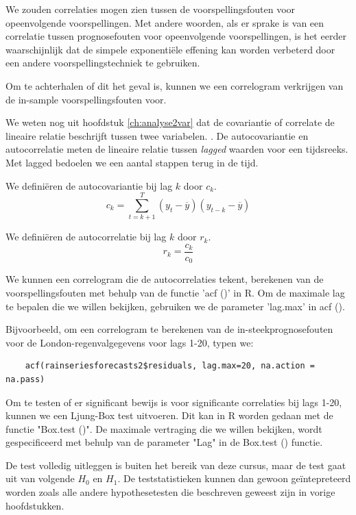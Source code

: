 We zouden correlaties mogen zien tussen de voorspellingsfouten voor opeenvolgende voorspellingen. Met andere woorden, als er sprake is van een correlatie tussen prognosefouten voor opeenvolgende voorspellingen, is het eerder waarschijnlijk dat de simpele exponentiële effening kan worden verbeterd door een andere voorspellingstechniek te gebruiken.

Om te achterhalen of dit het geval is, kunnen we een correlogram verkrijgen van de in-sample voorspellingsfouten voor.

We weten nog uit hoofdstuk \ref{ch:analyse2var} dat de covariantie of correlate de lineaire relatie beschrijft tussen twee variabelen. . De autocovariantie en autocorrelatie meten de lineaire relatie tussen \textit{lagged} waarden voor een tijdsreeks. Met lagged bedoelen we een aantal stappen terug in de tijd.

\begin{definition}[Autocovariantie]
	We defini\"eren de autocovariantie bij lag $k$ door $c_k$.
	\[ c_k = \sum_{t=k+1}^{T} (y_t - \overline{y})(y_{t-k} - \overline{y}) \]
\end{definition}

\begin{definition}[Autocorrelatie]
	We defini\"eren de autocorrelatie bij lag $k$ door $r_k$.
	\[ r_k = \frac{c_k}{c_0} \]
\end{definition}

 We kunnen een correlogram die de autocorrelaties tekent, berekenen van de voorspellingsfouten met behulp van de functie 'acf ()' in R. Om de maximale lag te bepalen die we willen bekijken, gebruiken we de parameter 'lag.max' in acf ().

Bijvoorbeeld, om een ​​correlogram te berekenen van de in-steekprognosefouten voor de London-regenvalgegevens voor lags 1-20, typen we:

\begin{lstlisting}
	acf(rainseriesforecasts2$residuals, lag.max=20, na.action = na.pass)
\end{lstlisting}

Om te testen of er significant bewijs is voor significante correlaties bij lags 1-20, kunnen we een Ljung-Box test uitvoeren. Dit kan in R worden gedaan met de functie "Box.test ()". De maximale vertraging die we willen bekijken, wordt gespecificeerd met behulp van de parameter "Lag" in de Box.test () functie.

De test volledig uitleggen is buiten het bereik van deze cursus, maar de test gaat uit van volgende $H_0$ en $H_1$. De teststatistieken kunnen dan gewoon ge\"intepreteerd worden zoals alle andere hypothesetesten die beschreven geweest zijn in vorige hoofdstukken. 

